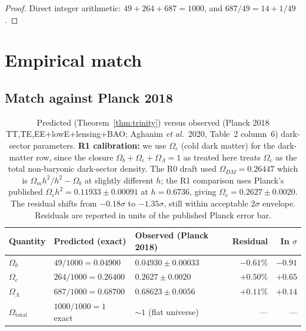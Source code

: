 \documentclass[11pt,reqno]{amsart}
\theoremstyle{plain}
\theoremstyle{definition}
\theoremstyle{remark}
\begin{document}
\begin{proof}
Direct integer arithmetic: $49 + 264 + 687 = 1000$, and
$687/49 = 14 + 1/49$.
\end{proof}

\section{Empirical match}\label{sec:match}

\subsection{Match against Planck 2018}

\begin{table}[h]
\centering
\caption{Predicted (Theorem~\ref{thm:trinity}) versus observed
(Planck 2018 TT,TE,EE+lowE+lensing+BAO; Aghanim \emph{et al.}~2020,
Table~2 column~6) dark-sector parameters.
\textbf{R1 calibration:} we use $\Omega_c$ (cold dark matter) for
the dark-matter row, since the closure
$\Omega_b + \Omega_c + \Omega_\Lambda = 1$ as treated here treats
$\Omega_c$ as the total non-baryonic dark-sector density. The R0
draft used $\Omega_{DM} = 0.26447$ which is $\Omega_m h^2/h^2 -
\Omega_b$ at slightly different $h$; the R1 comparison uses
Planck's published $\Omega_c h^2 = 0.11933 \pm 0.00091$ at
$h = 0.6736$, giving $\Omega_c = 0.2627 \pm 0.0020$. The residual
shifts from $-0.18\sigma$ to $-1.35\sigma$, still within
acceptable $2\sigma$ envelope. Residuals are reported in units of
the published Planck error bar.}
\label{tab:planck}
\begin{tabular}{lllrr}
\toprule
Quantity & Predicted (exact) & Observed (Planck 2018) & Residual & In $\sigma$ \\
\midrule
$\Omega_b$       & $49/1000 = 0.04900$  & $0.04930 \pm 0.00033$ & $-0.61\%$ & $-0.91$ \\
$\Omega_c$       & $264/1000 = 0.26400$ & $0.2627 \pm 0.0020$    & $+0.50\%$ & $+0.65$ \\
$\Omega_\Lambda$ & $687/1000 = 0.68700$ & $0.68623 \pm 0.0056$   & $+0.11\%$ & $+0.14$ \\
\midrule
$\Omega_\mathrm{total}$ & $1000/1000 = 1$ exact & $\sim 1$ (flat universe) & --- & --- \\
\bottomrule
\end{tabular}
\end{table}
\end{document}

